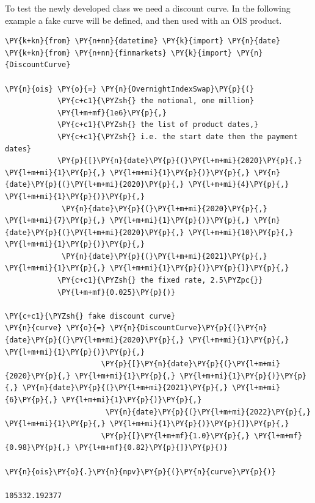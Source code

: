     To test the newly developed class we need a discount curve. In the
following example a fake curve will be defined, and then used with an
OIS product.

\begin{tcolorbox}[breakable, size=fbox, boxrule=1pt, pad at break*=1mm,colback=cellbackground, colframe=cellborder]
\begin{Verbatim}[commandchars=\\\{\}]
\PY{k+kn}{from} \PY{n+nn}{datetime} \PY{k}{import} \PY{n}{date}
\PY{k+kn}{from} \PY{n+nn}{finmarkets} \PY{k}{import} \PY{n}{DiscountCurve}

\PY{n}{ois} \PY{o}{=} \PY{n}{OvernightIndexSwap}\PY{p}{(}
            \PY{c+c1}{\PYZsh{} the notional, one million}
            \PY{l+m+mf}{1e6}\PY{p}{,}
            \PY{c+c1}{\PYZsh{} the list of product dates,}
            \PY{c+c1}{\PYZsh{} i.e. the start date then the payment dates}
            \PY{p}{[}\PY{n}{date}\PY{p}{(}\PY{l+m+mi}{2020}\PY{p}{,} \PY{l+m+mi}{1}\PY{p}{,} \PY{l+m+mi}{1}\PY{p}{)}\PY{p}{,} \PY{n}{date}\PY{p}{(}\PY{l+m+mi}{2020}\PY{p}{,} \PY{l+m+mi}{4}\PY{p}{,} \PY{l+m+mi}{1}\PY{p}{)}\PY{p}{,}
             \PY{n}{date}\PY{p}{(}\PY{l+m+mi}{2020}\PY{p}{,} \PY{l+m+mi}{7}\PY{p}{,} \PY{l+m+mi}{1}\PY{p}{)}\PY{p}{,} \PY{n}{date}\PY{p}{(}\PY{l+m+mi}{2020}\PY{p}{,} \PY{l+m+mi}{10}\PY{p}{,} \PY{l+m+mi}{1}\PY{p}{)}\PY{p}{,}
             \PY{n}{date}\PY{p}{(}\PY{l+m+mi}{2021}\PY{p}{,} \PY{l+m+mi}{1}\PY{p}{,} \PY{l+m+mi}{1}\PY{p}{)}\PY{p}{]}\PY{p}{,}
            \PY{c+c1}{\PYZsh{} the fixed rate, 2.5\PYZpc{}}
            \PY{l+m+mf}{0.025}\PY{p}{)}

\PY{c+c1}{\PYZsh{} fake discount curve}
\PY{n}{curve} \PY{o}{=} \PY{n}{DiscountCurve}\PY{p}{(}\PY{n}{date}\PY{p}{(}\PY{l+m+mi}{2020}\PY{p}{,} \PY{l+m+mi}{1}\PY{p}{,} \PY{l+m+mi}{1}\PY{p}{)}\PY{p}{,}
                      \PY{p}{[}\PY{n}{date}\PY{p}{(}\PY{l+m+mi}{2020}\PY{p}{,} \PY{l+m+mi}{1}\PY{p}{,} \PY{l+m+mi}{1}\PY{p}{)}\PY{p}{,} \PY{n}{date}\PY{p}{(}\PY{l+m+mi}{2021}\PY{p}{,} \PY{l+m+mi}{6}\PY{p}{,} \PY{l+m+mi}{1}\PY{p}{)}\PY{p}{,}
                       \PY{n}{date}\PY{p}{(}\PY{l+m+mi}{2022}\PY{p}{,} \PY{l+m+mi}{1}\PY{p}{,} \PY{l+m+mi}{1}\PY{p}{)}\PY{p}{]}\PY{p}{,}
                      \PY{p}{[}\PY{l+m+mf}{1.0}\PY{p}{,} \PY{l+m+mf}{0.98}\PY{p}{,} \PY{l+m+mf}{0.82}\PY{p}{]}\PY{p}{)}

\PY{n}{ois}\PY{o}{.}\PY{n}{npv}\PY{p}{(}\PY{n}{curve}\PY{p}{)}

105332.192377
\end{Verbatim}
\end{tcolorbox}

